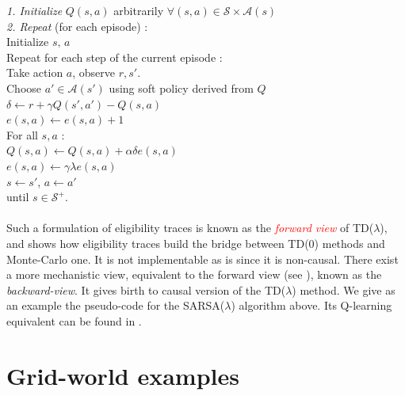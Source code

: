 \documentclass[a4paper]{report}
\begin{document}
{{{				
					{
						\begin{algorithm}[H]
						\label{sarsalambda}
	 					\SetAlgoLined
						\LinesNumbered
						\emph{\textsf{1. Initialize}} $Q(s,a)$ arbitrarily $\forall (s,a)\in\mathcal{S}\times\mathcal{A}(s)$ \\
						\BlankLine
						\BlankLine
						\emph{\textsf{2. Repeat}} (for each episode) : \\
						\Indp \Indp 
							Initialize $s,\, a$ \\
							Repeat for each step of the current episode :   \\
							\Indp \Indp 
								Take action $a$, observe $r, s'$. \\
								Choose $a'\in\mathcal{A}(s')$ using soft policy derived from $Q$\\
								$\delta \longleftarrow r + \gamma Q(s',a') - Q(s,a)$ \\
								$e(s,a) \longleftarrow e(s,a) +1 $\\
								For all $s,a$ : \\
								\Indp \Indp 
									$ Q(s,a) \longleftarrow Q(s,a) + \alpha \delta e(s,a) $ \\
									$ e(s,a) \longleftarrow \gamma \lambda e(s,a) $\\
								\Indm \Indm 
								$s\leftarrow s'$, $a\leftarrow a'$\\						
							\Indm \Indm 
						until $s\in\mathcal{S}^+$.\\
						\Indm \Indm 
						\end{algorithm}
					}


				\paragraph{} Such a formulation of eligibility traces is known as the \emph{\textcolor{red}{forward view}} of TD($\lambda$), and shows how eligibility traces build the bridge between TD(0) methods and Monte-Carlo one. It is not implementable as is since it is non-causal. There exist a more mechanistic view, equivalent to the forward view (see \cite{Sutton98a}), known as the \emph{backward-view}. It gives birth to causal version of the TD($\lambda$) method. We give as an example the pseudo-code for the SARSA($\lambda$) algorithm above. Its Q-learning equivalent can be found in \cite{Sutton98a}.   
			}
		}
	
		\section{Grid-world examples}
		{
}}
\end{document}
